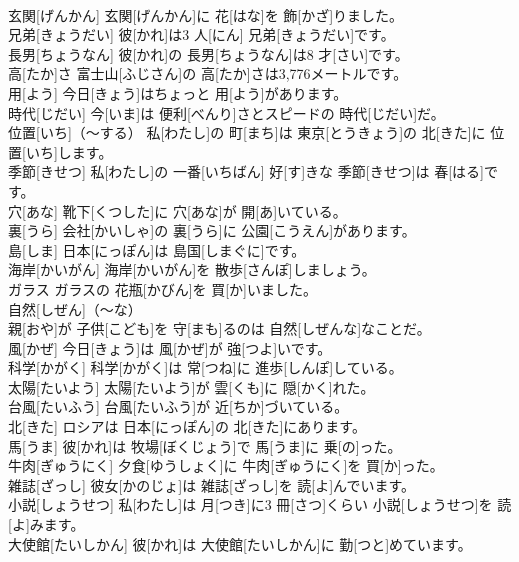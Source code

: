 \documentclass[8pt]{extreport}
\begin{document}
\begin{CJK}{UTF8}{min}
\\	玄関[げんかん]	玄関[げんかん]に 花[はな]を 飾[かざ]りました。		
\\	兄弟[きょうだい]	彼[かれ]は3 人[にん] 兄弟[きょうだい]です。		
\\	長男[ちょうなん]	彼[かれ]の 長男[ちょうなん]は8 才[さい]です。		
\\	高[たか]さ	富士山[ふじさん]の 高[たか]さは3,776メートルです。		
\\	用[よう]	今日[きょう]はちょっと 用[よう]があります。		
\\	時代[じだい]	今[いま]は 便利[べんり]さとスピードの 時代[じだい]だ。		
\\	位置[いち]（～する）	私[わたし]の 町[まち]は 東京[とうきょう]の 北[きた]に 位置[いち]します。		
\\	季節[きせつ]	私[わたし]の 一番[いちばん] 好[す]きな 季節[きせつ]は 春[はる]です。		
\\	穴[あな]	靴下[くつした]に 穴[あな]が 開[あ]いている。		
\\	裏[うら]	会社[かいしゃ]の 裏[うら]に 公園[こうえん]があります。		
\\	島[しま]	日本[にっぽん]は 島国[しまぐに]です。		
\\	海岸[かいがん]	海岸[かいがん]を 散歩[さんぽ]しましょう。		
\\	ガラス	ガラスの 花瓶[かびん]を 買[か]いました。		
\\	自然[しぜん]（～な）
\\	親[おや]が 子供[こども]を 守[まも]るのは 自然[しぜんな]なことだ。		
\\	風[かぜ]	今日[きょう]は 風[かぜ]が 強[つよ]いです。		
\\	科学[かがく]	科学[かがく]は 常[つね]に 進歩[しんぽ]している。		
\\	太陽[たいよう]	太陽[たいよう]が 雲[くも]に 隠[かく]れた。		
\\	台風[たいふう]	台風[たいふう]が 近[ちか]づいている。		
\\	北[きた]	ロシアは 日本[にっぽん]の 北[きた]にあります。		
\\	馬[うま]	彼[かれ]は 牧場[ぼくじょう]で 馬[うま]に 乗[の]った。		
\\	牛肉[ぎゅうにく]	夕食[ゆうしょく]に 牛肉[ぎゅうにく]を 買[か]った。		
\\	雑誌[ざっし]	彼女[かのじょ]は 雑誌[ざっし]を 読[よ]んでいます。		
\\	小説[しょうせつ]	私[わたし]は 月[つき]に3 冊[さつ]くらい 小説[しょうせつ]を 読[よ]みます。		
\\	大使館[たいしかん]	彼[かれ]は 大使館[たいしかん]に 勤[つと]めています。		

\end{CJK}
\end{document}
